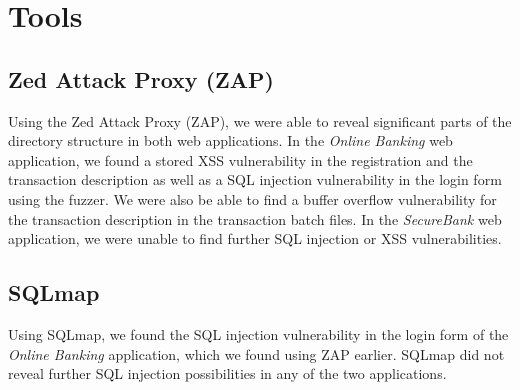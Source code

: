 \chapter{Tools}\label{chapter:tools}

\section{Zed Attack Proxy (ZAP)}
Using the Zed Attack Proxy (ZAP), we were able to reveal significant parts of the directory structure in both web applications. In the \textit{Online Banking} web application, we found a stored XSS vulnerability in the registration and the transaction description as well as a SQL injection vulnerability in the login form using the fuzzer. We were also be able to find a buffer overflow vulnerability for the transaction description in the transaction batch files. In the \textit{SecureBank} web application, we were unable to find further SQL injection or XSS vulnerabilities.

\section{SQLmap}
Using SQLmap, we found the SQL injection vulnerability in the login form of the \textit{Online Banking} application, which we found using ZAP earlier. SQLmap did not reveal further SQL injection possibilities in any of the two applications.
